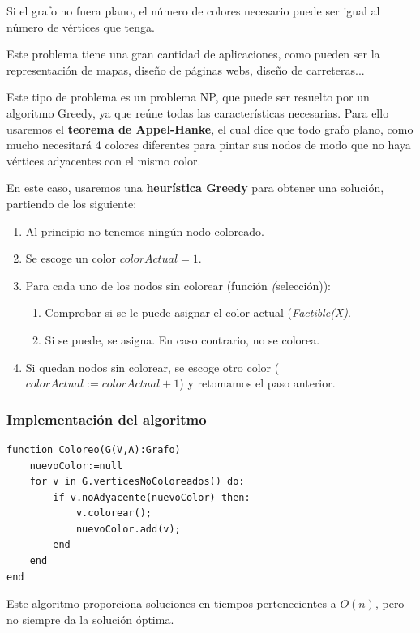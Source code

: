 \documentclass[10pt,a4paper,spanish]{report}
\theoremstyle{definition}
\theoremstyle{remark}
\begin{document}
Si el grafo no fuera plano, el número de colores necesario puede ser igual al número de vértices que tenga.

Este problema tiene una gran cantidad de aplicaciones, como pueden ser la representación de mapas, diseño de páginas webs, diseño de carreteras...

Este tipo de problema es un problema NP, que puede ser resuelto por un algoritmo Greedy, ya que reúne todas las características necesarias. Para ello usaremos el \textbf{\textcolor{electriccrimson}{teorema de Appel-Hanke}}, el cual dice que todo grafo plano, como mucho necesitará 4 colores diferentes para pintar sus nodos de modo que no haya vértices adyacentes con el mismo color.

En este caso, usaremos una \textbf{\textcolor{electriccrimson}{heurística Greedy}} para obtener una solución, partiendo de los siguiente:

\begin{enumerate}[---]
    \item Al principio no tenemos ningún nodo coloreado.
    \item Se escoge un color $colorActual=1$.
    \item Para cada uno de los nodos sin colorear (función \textit(selección)):
    \begin{enumerate}[$\bullet$]
        \item Comprobar si se le puede asignar el color actual (\textit{Factible(X)}.
        \item Si se puede, se asigna. En caso contrario, no se colorea.
    \end{enumerate}
    \item Si quedan nodos sin colorear, se escoge otro color ($colorActual:=colorActual+1$) y retomamos el paso anterior.
\end{enumerate}

\subsubsection{\textcolor{electriccrimson}Implementación del algoritmo}

\begin{verbatim}
function Coloreo(G(V,A):Grafo)
    nuevoColor:=null
    for v in G.verticesNoColoreados() do:
        if v.noAdyacente(nuevoColor) then:
            v.colorear();
            nuevoColor.add(v);
        end
    end
end    
\end{verbatim}

Este algoritmo proporciona soluciones en tiempos pertenecientes a $O(n)$, pero no siempre da la solución óptima.
\end{document}

